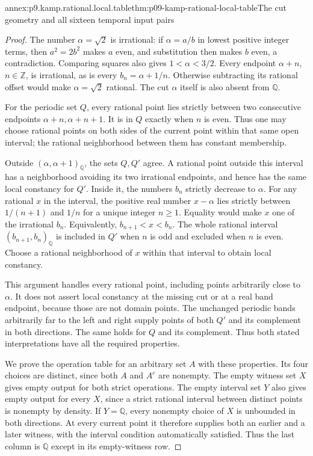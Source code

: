 \begin{annexitem}{annex:p9.kamp.rational.local.table}{thm:p09-kamp-rational-local-table}{The cut geometry and all sixteen temporal input pairs}
\begin{proof}
The number \(\alpha=\sqrt2\) is irrational: if
\(\alpha=a/b\) in lowest positive integer terms,
then \(a^2=2b^2\) makes \(a\) even, and
substitution then makes \(b\) even, a contradiction.
Comparing squares also gives \(1<\alpha<3/2\).
Every endpoint \(\alpha+n\), \(n\in\mathbb Z\),
is irrational, as is every \(b_n=\alpha+1/n\).
Otherwise subtracting its rational offset would make
\(\alpha=\sqrt2\) rational. The cut \(\alpha\)
itself is also absent from \(\mathbb Q\).

For the periodic set \(Q\), every rational point lies
strictly between two consecutive endpoints
\(\alpha+n,\alpha+n+1\). It is in \(Q\) exactly
when \(n\) is even. Thus one may choose rational
points on both sides of the current point within that
same open interval; the rational neighborhood between
them has constant membership.

Outside \((\alpha,\alpha+1)_{\mathbb Q}\), the sets
\(Q,Q'\) agree. A rational point outside this interval
has a neighborhood avoiding its two irrational endpoints,
and hence has the same local constancy for \(Q'\).
Inside it, the numbers \(b_n\) strictly decrease to
\(\alpha\). For any rational \(x\) in the interval,
the positive real number \(x-\alpha\) lies strictly
between \(1/(n+1)\) and \(1/n\) for a unique
integer \(n\geq1\). Equality would make \(x\)
one of the irrational \(b_n\). Equivalently,
\(b_{n+1}<x<b_n\). The whole rational interval
\((b_{n+1},b_n)_{\mathbb Q}\) is included in \(Q'\)
when \(n\) is odd and excluded when \(n\) is even.
Choose a rational neighborhood of \(x\) within that
interval to obtain local constancy.

This argument handles every rational point, including
points arbitrarily close to \(\alpha\). It does not
assert local constancy at the missing cut or at a real
band endpoint, because those are not domain points.
The unchanged periodic bands arbitrarily far to the
left and right supply points of both \(Q'\) and
its complement in both directions. The same holds for
\(Q\) and its complement. Thus both stated
interpretations have all the required properties.

We prove the operation table for an arbitrary set \(A\)
with these properties. Its four choices are distinct,
since both \(A\) and \(A^c\) are nonempty. The
empty witness set \(X\) gives empty output for both
strict operations. The empty interval set \(Y\)
also gives empty output for every \(X\), since a
strict rational interval between distinct points is
nonempty by density. If \(Y=\mathbb Q\), every
nonempty choice of \(X\) is unbounded in both
directions. At every current point it therefore supplies
both an earlier and a later witness, with the interval
condition automatically satisfied. Thus the last column
is \(\mathbb Q\) except in its empty-witness row.


\end{proof}
\end{annexitem}
